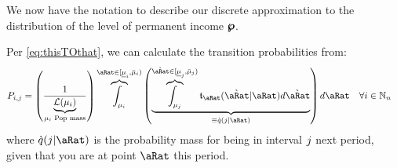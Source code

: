 \documentclass[../BufferStockTheory.tex]{subfiles}\usepackage{ApndxSteadyState}
\begin{document}
  We now have the notation to describe our discrete approximation to the distribution of the level of permanent income $\pmb{\wp}$.  %



  Per \eqref{eq:thisTOthat}, we can calculate the transition probabilities from:
  \begin{align}
    \PTrns_{\this,\that} &= \left(\frac{1}{\underbrace{\Lebes(\SetSub_{\this})}_{\SetSub_{\this}\text{~Pop mass}}}\right)\overbrace{\int_{\SetSub_{\this}}}^{\point\in[\Bot{\SetSub}_{\this},\Top{\SetSub}_{\this})}\left(\underbrace{\overbrace{\int_{\SetSub_{\that}}}^{\Nxt{\point}\in[\Bot{\SetSub}_{\that},\Top{\SetSub}_{\that})}\trns_{\point}(\Nxt{\point}|\point){d\Nxt{\point}}}_{\equiv \Nxt{\pDistDscr}(\that|\point)} \right){d\point}~~~\forall\this\in\Nteger_{\StNum} \label{eq:thispTOthatp}
  \end{align}
  where $\Nxt{\pDistDscr}(\that|\point)$ is the probability mass for being in interval $j$ next period, given that you are at point $\point$ this period.
\end{document}
